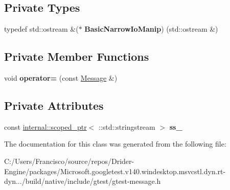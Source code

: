\subsection*{Private Types}
\begin{DoxyCompactItemize}
\item 
\mbox{\label{classtesting_1_1_message_ad398b70e2a11b923cef05c809b0eeb92}} 
typedef std\+::ostream \&($\ast$ {\bfseries Basic\+Narrow\+Io\+Manip}) (std\+::ostream \&)
\end{DoxyCompactItemize}
\subsection*{Private Member Functions}
\begin{DoxyCompactItemize}
\item 
\mbox{\label{classtesting_1_1_message_a5a0462b539ffb88f15ea0c67977774af}} 
void {\bfseries operator=} (const \hyperlink{classtesting_1_1_message}{Message} \&)
\end{DoxyCompactItemize}
\subsection*{Private Attributes}
\begin{DoxyCompactItemize}
\item 
\mbox{\label{classtesting_1_1_message_ad46fbddd62cde8526744ae32e3322b76}} 
const \hyperlink{classtesting_1_1internal_1_1scoped__ptr}{internal\+::scoped\+\_\+ptr}$<$ \+::std\+::stringstream $>$ {\bfseries ss\+\_\+}
\end{DoxyCompactItemize}


The documentation for this class was generated from the following file\+:\begin{DoxyCompactItemize}
\item 
C\+:/\+Users/\+Francisco/source/repos/\+Drider-\/\+Engine/packages/\+Microsoft.\+googletest.\+v140.\+windesktop.\+msvcstl.\+dyn.\+rt-\/dyn.../build/native/include/gtest/gtest-\/message.\+h\end{DoxyCompactItemize}
